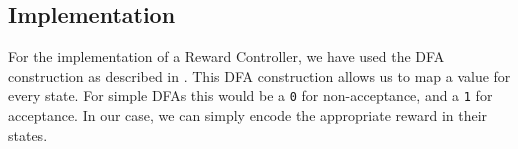 \subsection*{Implementation}
For the implementation of a Reward Controller, we have used the DFA construction as described in \cite{g:moore}. This DFA construction allows us to map a value for every state. For simple DFAs this would be a \texttt{0} for non-acceptance, and a \texttt{1} for acceptance. In our case, we can simply encode the appropriate reward in their states. 